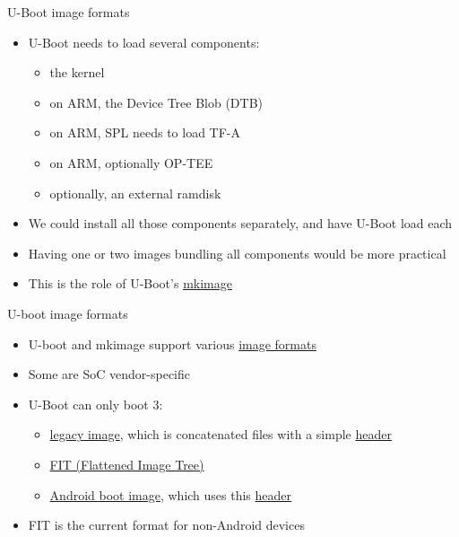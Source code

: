 \begin{frame}{U-Boot image formats}
  \begin{itemize}
    \item U-Boot needs to load several components:
    \begin{itemize}
      \item the kernel
      \item on ARM, the Device Tree Blob (DTB)
      \item on ARM, SPL needs to load TF-A
      \item on ARM, optionally OP-TEE
      \item optionally, an external ramdisk
    \end{itemize}
    \item We could install all those components separately, and have U-Boot load each
    \item Having one or two images bundling all components would be more practical
    \item This is the role of U-Boot's
          \href{https://elixir.bootlin.com/u-boot/v2026.01/source/tools/mkimage.c}{mkimage}
  \end{itemize}
\end{frame}

\begin{frame}{U-boot image formats}
  \begin{itemize}
    \item U-boot and mkimage support various
          \href{https://elixir.bootlin.com/u-boot/v2026.01/source/boot/image.c\#L141}{image formats}
    \item Some are SoC vendor-specific
    \item U-Boot can only boot 3:
    \begin{itemize}
      \item \href{https://elixir.bootlin.com/u-boot/v2026.01/C/ident/IMAGE\_FORMAT\_LEGACY}{legacy image},
            which is concatenated files with a simple
            \href{https://elixir.bootlin.com/u-boot/v2026.01/source/include/image.h\#L324}{header}
      \item \href{https://elixir.bootlin.com/u-boot/v2026.01/C/ident/IMAGE\_FORMAT\_FIT}{FIT (Flattened Image Tree)}
      \item \href{https://elixir.bootlin.com/u-boot/v2026.01/C/ident/IMAGE\_FORMAT\_ANDROID}{Android boot image},
            which uses this \href{https://source.android.com/docs/core/architecture/bootloader/boot-image-header}{header}
    \end{itemize}
    \item FIT is the current format for non-Android devices
  \end{itemize}
\end{frame}

